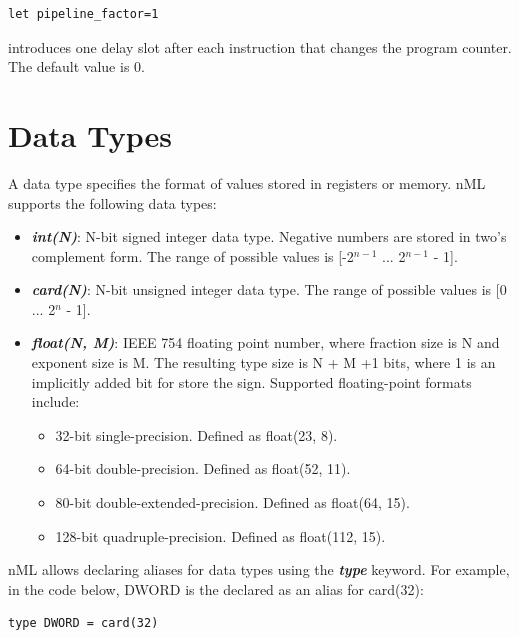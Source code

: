\documentclass[oneside,final,14pt]{extreport}
\begin{document}
\begin{lstlisting}
let pipeline_factor=1
\end{lstlisting}

introduces one delay slot after each instruction that changes the program counter.
The default value is 0.


\section{Data Types}

A data type specifies the format of values stored in registers or memory.
nML supports the following data types:

\begin{itemize}

\item \textbf{\textit{int(N)}}:
N-bit signed integer data type. Negative numbers are stored in two's complement
form. The range of possible values is [-2$^{n-1}$ ... 2$^{n-1}$ - 1].

\item \textbf{\textit{card(N)}}:
N-bit unsigned integer data type. The range of possible values is [0 ... 2$^n$ - 1].

\item \textbf{\textit{float(N, M)}}: IEEE 754 floating point number, where fraction
size is N and exponent size is M. The resulting type size is N + M +1 bits, where 1
is an implicitly added bit for store the sign. Supported floating-point formats include:

\begin{itemize}
\item 32-bit single-precision. Defined as float(23, 8).
\item 64-bit double-precision. Defined as float(52, 11).
\item 80-bit double-extended-precision. Defined as float(64, 15).
\item 128-bit quadruple-precision. Defined as float(112, 15).
\end{itemize}

\end{itemize}

nML allows declaring aliases for data types using the \textbf{\textit{type}} keyword.
For example, in the code below, DWORD is the declared as an alias for card(32):

\begin{lstlisting}
type DWORD = card(32)
\end{lstlisting}
\end{document}
